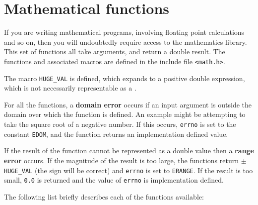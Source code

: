   

 
        \section{Mathematical functions}
        

  

  If you are writing mathematical programs, involving floating
   point calculations and so on, then you will undoubtedly
   require access to the mathematics library.  This set of
   functions all take \double{} arguments, and return a double
   result.  The functions and associated macros are defined in
   the include file \texttt{<math.h>}.


  The macro \texttt{HUGE\_VAL} is defined, which expands to a positive
   double expression, which is not necessarily representable as
   a \float.


  For all the functions, a \textbf{domain error} occurs if an input
   argument is outside the domain over which the function is
   defined. An example might be attempting to take the square
   root of a negative number. If this occurs, \texttt{errno} is set to
   the constant \texttt{EDOM}, and the function returns an
   implementation defined value.


  If the result of the function cannot be represented as a double value then
   a \textbf{range error} occurs.  If the magnitude of the result is too
   large, the functions return \texttt{$\pm$HUGE\_VAL} (the sign will be
   correct) and \texttt{errno} is set to \texttt{ERANGE}.  If the
   result is too small, \texttt{0.0} is returned and the value of
   \texttt{errno} is implementation defined.


  The following list briefly describes each of the functions
   available:


